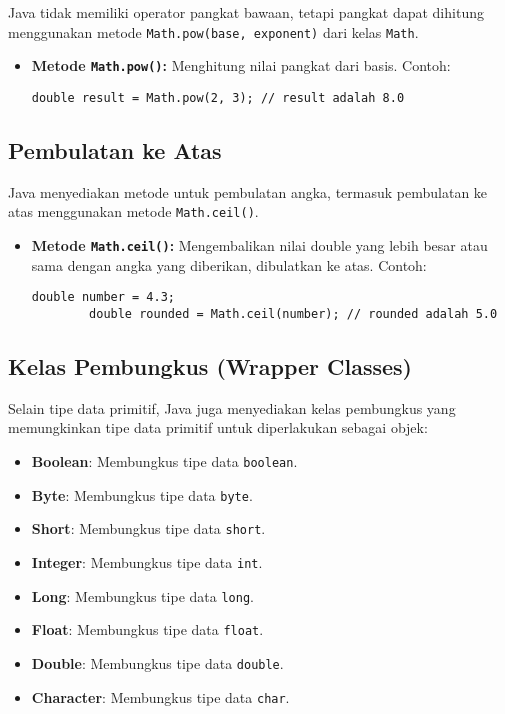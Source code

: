 Java tidak memiliki operator pangkat bawaan, tetapi pangkat dapat dihitung menggunakan metode \texttt{Math.pow(base, exponent)} dari kelas \texttt{Math}.

\begin{itemize}
	\item \textbf{Metode \texttt{Math.pow()}:} Menghitung nilai pangkat dari basis. Contoh:
	\begin{lstlisting}[style=JavaStyle]
		double result = Math.pow(2, 3); // result adalah 8.0
	\end{lstlisting}
\end{itemize}

\subsection{Pembulatan ke Atas}

Java menyediakan metode untuk pembulatan angka, termasuk pembulatan ke atas menggunakan metode \texttt{Math.ceil()}.

\begin{itemize}
	\item \textbf{Metode \texttt{Math.ceil()}:} Mengembalikan nilai double yang lebih besar atau sama dengan angka yang diberikan, dibulatkan ke atas. Contoh:
	\begin{lstlisting}[style=JavaStyle]
		double number = 4.3;
		double rounded = Math.ceil(number); // rounded adalah 5.0
	\end{lstlisting}
\end{itemize}

\subsection{Kelas Pembungkus (Wrapper Classes)}
Selain tipe data primitif, Java juga menyediakan kelas pembungkus yang memungkinkan tipe data primitif untuk diperlakukan sebagai objek:

\begin{itemize}
	\item \textbf{Boolean}: Membungkus tipe data \texttt{boolean}.
	\item \textbf{Byte}: Membungkus tipe data \texttt{byte}.
	\item \textbf{Short}: Membungkus tipe data \texttt{short}.
	\item \textbf{Integer}: Membungkus tipe data \texttt{int}.
	\item \textbf{Long}: Membungkus tipe data \texttt{long}.
	\item \textbf{Float}: Membungkus tipe data \texttt{float}.
	\item \textbf{Double}: Membungkus tipe data \texttt{double}.
	\item \textbf{Character}: Membungkus tipe data \texttt{char}.
\end{itemize}

